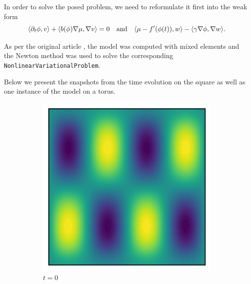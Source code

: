 \documentclass{article} %
\begin{document}
In order to solve the posed problem, we need to reformulate it first into the weak form
\begin{equation}
    \langle \partial_t \phi, v \rangle + \langle b(\phi) \nabla \mu, \nabla v \rangle = 0 \qq{and} \langle \mu - f'(\phi(t)), w \rangle - \langle \gamma \nabla \phi, \nabla w \rangle.
\end{equation}

As per the original article \cite{Brunk2023}, the model was computed with mixed elements and the Newton method was used to solve the corresponding \texttt{NonlinearVariationalProblem}.


Below we present the snapshots from the time evolution on the square as well as one instance of the model on a torus.


\begin{figure}[!h]
    \centering
    \begin{subfigure}[b]{0.2\textwidth}
        \includegraphics[width=\textwidth]{phi_0.pdf}
        \caption*{$t = 0$}
        \label{fig:image1}
    \end{subfigure}
    \hfill
    \begin{subfigure}[b]{0.2\textwidth}

\end{subfigure}
\end{figure}
\end{document}
